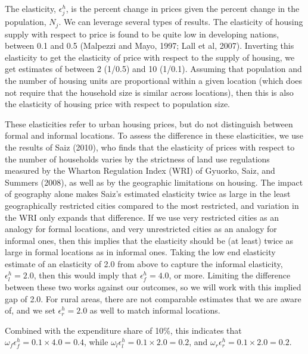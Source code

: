 \documentclass[10pt]{article}
\begin{document}
The elasticity, $\epsilon^h_j$, is the percent change in prices given the percent change in the population, $N_j$. We can leverage several types of results. The elasticity of housing supply with respect to price is found to be quite low in developing nations, between 0.1 and 0.5 (Malpezzi and Mayo, 1997; Lall et al, 2007). Inverting this elasticity to get the elasticity of price with respect to the supply of housing, we get estimates of between 2 (1/0.5) and 10 (1/0.1). Assuming that population and the number of housing units are proportional within a given location (which does not require that the household size is similar across locations), then this is also the elasticity of housing price with respect to population size.

These elasticities refer to urban housing prices, but do not distinguish between formal and informal locations. To assess the difference in these elasticities, we use the results of Saiz (2010), who finds that the elasticity of prices with respect to the number of households varies by the strictness of land use regulations measured by the Wharton Regulation Index (WRI) of Gyuorko, Saiz, and Summers (2008), as well as by the geographic limitations on housing. The impact of geography alone makes Saiz's estimated elasticity twice as large in the least geographically restricted cities compared to the most restricted, and variation in the WRI only expands that difference. If we use very restricted cities as an analogy for formal locations, and very unrestricted cities as an analogy for informal ones, then this implies that the elasticity should be (at least) twice as large in formal locations as in informal ones. Taking the low end elasticity estimate of an elasticity of 2.0 from above to capture the informal elasticity, $\epsilon^h_l = 2.0$, then this would imply that $\epsilon^h_f = 4.0$, or more. Limiting the difference between these two works against our outcomes, so we will work with this implied gap of 2.0. For rural areas, there are not comparable estimates that we are aware of, and we set $\epsilon^h_r = 2.0$ as well to match informal locations.

Combined with the expenditure share of 10\%, this indicates that $\omega_f \epsilon^h_f = 0.1 \times 4.0 = 0.4$, while $\omega_l \epsilon^h_l = 0.1 \times 2.0 = 0.2$, and $\omega_r \epsilon^h_r = 0.1 \times 2.0 = 0.2$. 
\end{document}
